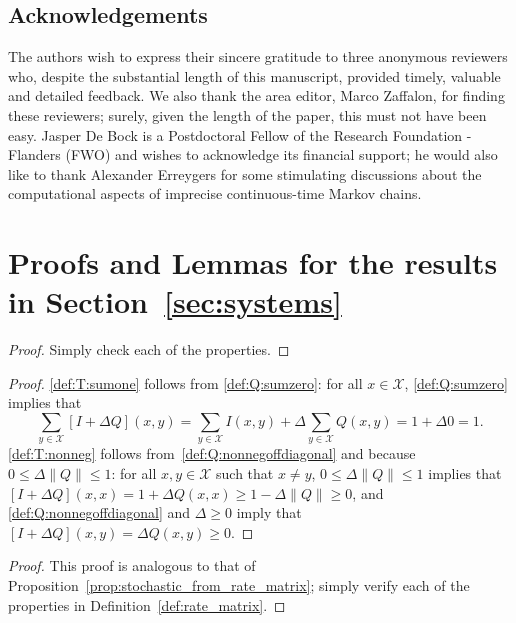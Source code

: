 \documentclass[10pt,a4paper]{paper}
\theoremstyle{definition}
\newcommand{\states}{\mathcal{X}}
\newcommand{\norm}[1]{\left\lVert #1 \right\rVert}
\begin{document}
\subsection*{Acknowledgements}

The authors wish to express their sincere gratitude to three anonymous reviewers who, despite the substantial length of this manuscript, provided timely, valuable and detailed feedback. We also thank the area editor, Marco Zaffalon, for finding these reviewers; surely, given the length of the paper, this must not have been easy. Jasper De Bock is a Postdoctoral Fellow of the Research Foundation - Flanders (FWO) and wishes to acknowledge its financial support; he would also like to thank Alexander Erreygers for some stimulating discussions about the computational aspects of imprecise continuous-time Markov chains.

 


\appendix

\section{Proofs and Lemmas for the results in Section~\ref{sec:systems}}\label{app:systems}

\lemmacompositiontransitionmatrix*
\begin{proof}
Simply check each of the properties.
\end{proof}

\propstochasticfromratematrix*
\begin{proof}%
\ref{def:T:sumone} follows from \ref{def:Q:sumzero}: for all $x\in\states$, \ref{def:Q:sumzero} implies that
\begin{equation*}
\sum_{y\in\states} [I + \Delta Q](x,y) = \sum_{y\in\states}I(x,y) + \Delta \sum_{y\in\states}Q(x,y) = 1+\Delta 0=1.
\end{equation*}
\ref{def:T:nonneg} follows from~\ref{def:Q:nonnegoffdiagonal} and because $0\leq \Delta\norm{Q} \leq 1$: for all $x,y\in\states$ such that $x\neq y$, $0\leq\Delta\norm{Q} \leq 1$ implies that $[I+\Delta Q](x,x)=1+\Delta Q(x,x)\geq 1-\Delta\norm{Q}\geq0$, and \ref{def:Q:nonnegoffdiagonal} and $\Delta\geq0$ imply that $[I+\Delta Q](x,y)=\Delta Q(x,y)\geq0$.
\end{proof}

\propratefromstochasticmatrix*
\begin{proof}
This proof is analogous to that of Proposition~\ref{prop:stochastic_from_rate_matrix}; simply verify each of the properties in Definition~\ref{def:rate_matrix}.
\end{proof}
\end{document}
